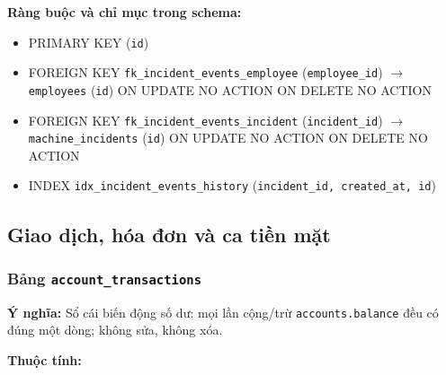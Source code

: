 \textbf{Ràng buộc và chỉ mục trong schema:}

\begin{itemize}

\item PRIMARY KEY (\texttt{id})

\item FOREIGN KEY \texttt{fk\_incident\_events\_employee} (\texttt{employee\_id}) $\rightarrow$ \texttt{employees} (\texttt{id}) ON UPDATE NO ACTION ON DELETE NO ACTION

\item FOREIGN KEY \texttt{fk\_incident\_events\_incident} (\texttt{incident\_id}) $\rightarrow$ \texttt{machine\_incidents} (\texttt{id}) ON UPDATE NO ACTION ON DELETE NO ACTION

\item INDEX \texttt{idx\_incident\_events\_history} (\texttt{incident\_id, created\_at, id})

\end{itemize}

\subsection{Giao dịch, hóa đơn và ca tiền mặt}

\subsubsection{Bảng \texttt{account\_transactions}}

\textbf{Ý nghĩa:} Sổ cái biến động số dư: mọi lần cộng/trừ \texttt{accounts.balance} đều có đúng một dòng; không sửa, không xóa.\par

\textbf{Thuộc tính:}

